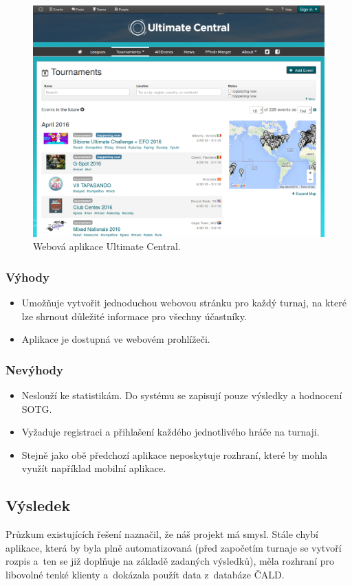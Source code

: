 \begin{figure}[ht!]
\centering
\includegraphics[width=130mm]{./images/ultimate-central.png}
\caption{Webová aplikace Ultimate Central.\label{overflow}}
\label{fig:uwsgi}
\end{figure}

\subsubsection*{Výhody}
\begin{itemize}
  \item Umožňuje vytvořit jednoduchou webovou stránku pro každý turnaj, na které lze shrnout důležité informace pro všechny účastníky.
  \item Aplikace je dostupná ve webovém prohlížeči.
\end{itemize}

\subsubsection*{Nevýhody}
\begin{itemize}
  \item Neslouží ke statistikám. Do systému se zapisují pouze výsledky a hodnocení SOTG.
  \item Vyžaduje registraci a přihlašení každého jednotlivého hráče na turnaji.
  \item Stejně jako obě předchozí aplikace neposkytuje rozhraní, které by mohla využít například mobilní aplikace.
\end{itemize}

\subsection{Výsledek}

\indent

Průzkum existujících řešení naznačil, že náš projekt má smysl. Stále chybí aplikace,
která by byla plně automatizovaná (před započetím turnaje se vytvoří rozpis a~ten se
již doplňuje na základě zadaných výsledků), měla rozhraní pro libovolné tenké klienty
a~dokázala použít data z~databáze ČALD.
